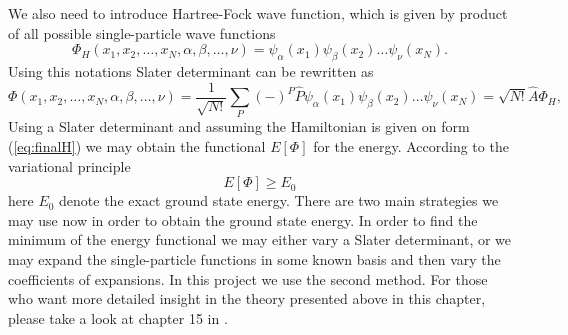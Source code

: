 \documentclass[twoside,english]{uiofysmaster}
\theoremstyle{definition}
\begin{document}
We also need to introduce Hartree-Fock wave function, which is given by product of all possible single-particle wave functions
\begin{equation}
\Phi_H(x_1,x_2,\dots,x_N,\alpha,\beta,\dots,\nu) =
\psi_{\alpha}(x_1)
\psi_{\beta}(x_2)\dots\psi_{\nu}(x_N).
\end{equation}
Using this notations Slater determinant can be rewritten as
\begin{equation}\label{determ}
\Phi(x_1,x_2,\dots,x_N,\alpha,\beta,\dots,\nu) = \frac{1}{\sqrt{N!}}\sum_{P} (-)^P\hat{P}\psi_{\alpha}(x_1)
\psi_{\beta}(x_2)\dots\psi_{\nu}(x_N)=\sqrt{N!}\hat{A}\Phi_H,
\end{equation}
Using a Slater determinant and assuming the Hamiltonian is given on form (\ref{eq:finalH}) we may obtain the functional $E[\Phi]$ for the energy. According to the variational principle
\begin{equation}
E[\Phi] \ge E_0
\end{equation}
here $E_0$ denote the exact ground state energy. 
There are two main strategies we may use now in order to obtain the ground state energy. In order to find the minimum of the energy functional we may either vary a Slater determinant, or we may expand the single-particle functions in some known basis and then vary the coefficients of expansions. In this project we use the second method. For those who want more detailed insight in the theory presented above in this chapter, please take a look at chapter 15 in \cite{mortenhjorth-jensenCOMPUTATIONALPHYSICS2015}.
\end{document}
